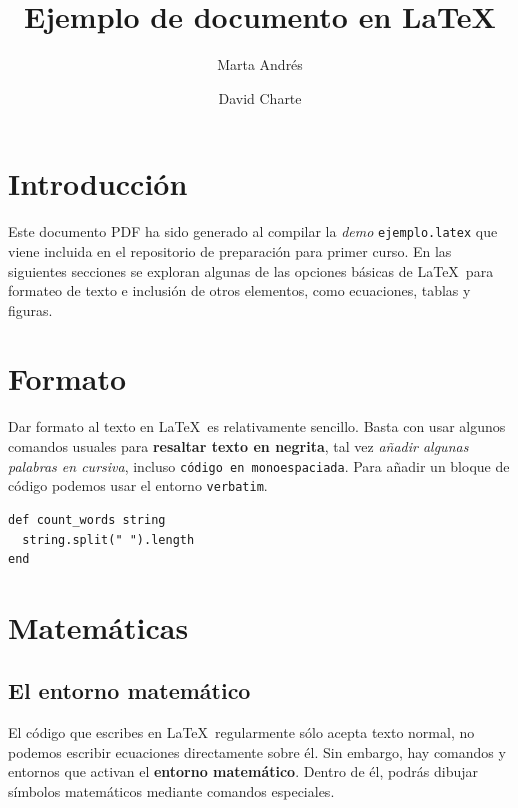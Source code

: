 \documentclass[a4paper]{article}
\title{Ejemplo de documento en LaTeX}
\author{Marta Andrés \and David Charte}
\begin{document}
\maketitle

\section{Introducción}

Este documento PDF ha sido generado al compilar la \textit{demo}
\texttt{ejemplo.latex} que viene incluida en el repositorio de
preparación para primer curso. En las siguientes secciones se exploran
algunas de las opciones básicas de \LaTeX\ para formateo de texto e
inclusión de otros elementos, como ecuaciones, tablas y figuras.

\section{Formato}

Dar formato al texto en \LaTeX\ es relativamente sencillo. Basta con
usar algunos comandos usuales para \textbf{resaltar texto en negrita},
tal vez \textit{añadir algunas palabras en cursiva}, incluso
\texttt{código en monoespaciada}. Para añadir un bloque de código
podemos usar el entorno \texttt{verbatim}.

\begin{verbatim}
def count_words string
  string.split(" ").length
end
\end{verbatim}

\section{Matemáticas}

\subsection{El entorno matemático}
El código que escribes en \LaTeX\ regularmente sólo acepta texto
normal, no podemos escribir ecuaciones directamente sobre él. Sin
embargo, hay comandos y entornos que activan el \textbf{entorno
  matemático}. Dentro de él, podrás dibujar símbolos matemáticos
mediante comandos especiales.
\end{document}
